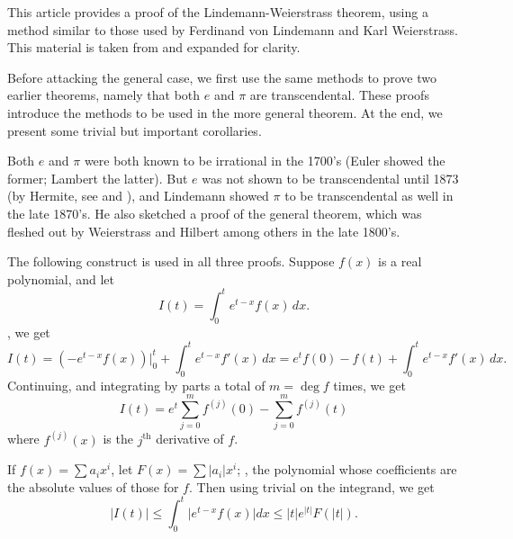\documentclass[12pt]{article}
\newcommand{\fdiff}[2]{f^{(#1)}(#2)}
\begin{document}

This article provides a proof of the Lindemann-Weierstrass theorem, using a method similar to those used by Ferdinand von Lindemann and Karl Weierstrass. This material is taken from \cite{bib:baker} and expanded for clarity.

Before attacking the general case, we first use the same methods to prove two earlier theorems, namely that both $e$ and $\pi$ are transcendental. These proofs introduce the methods to be used in the more general theorem. At the end, we present some trivial but important corollaries.

Both $e$ and $\pi$ were both known to be irrational in the 1700's (Euler showed the former; Lambert the latter). But $e$ was not shown to be transcendental until 1873 (by Hermite, see \cite{bib:hermite} and \cite{bib:hermitetrans}), and Lindemann showed $\pi$ to be transcendental as well in the late 1870's. He also sketched a proof of the general theorem, which was fleshed out by Weierstrass and Hilbert among others in the late 1800's.

The following construct is used in all three proofs. Suppose $f(x)$ is a real polynomial, and let
\[I(t)=\int_0^t e^{t-x}f(x)\, dx.\]
, we get
\[I(t)=(-e^{t-x}f(x))\bigg|_0^t +\int_0^t e^{t-x}f'(x)\, dx=e^tf(0)-f(t)+\int_0^t e^{t-x}f'(x)\, dx .\]
Continuing, and integrating by parts a total of $m=\deg f$ times, we get
\begin{equation}\label{one}I(t)=e^t\sum_{j=0}^m \fdiff j0 - \sum_{j=0}^m \fdiff jt
\end{equation}
where $\fdiff jx$ is the $j^{\mathrm{th}}$ derivative of $f$.

If $f(x)=\sum a_ix^i$, let $F(x)=\sum \lvert a_i\rvert x^i$; , the polynomial whose coefficients are the absolute values of those for $f$. Then using trivial  on the integrand, we get
\begin{equation}\label{two}\lvert I(t)\rvert\leq\int_0^t \lvert e^{t-x}f(x)\rvert dx \leq \lvert t\rvert e^{\lvert t\rvert}F(\lvert t\rvert).\end{equation}
\end{document}
